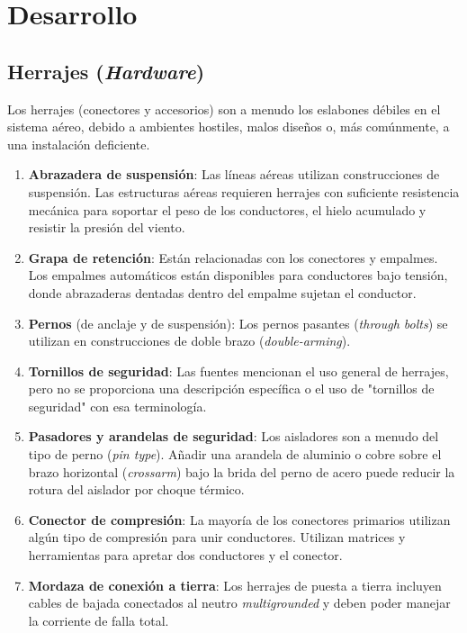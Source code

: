 \section*{Desarrollo}

\subsection*{Herrajes (\textit{Hardware})}
Los herrajes (conectores y accesorios) son a menudo los eslabones débiles en el sistema aéreo, debido a ambientes hostiles, malos diseños o, más comúnmente, a una instalación deficiente.

\begin{enumerate}
    \item \textbf{Abrazadera de suspensión}: Las líneas aéreas utilizan construcciones de suspensión. Las estructuras aéreas requieren herrajes con suficiente resistencia mecánica para soportar el peso de los conductores, el hielo acumulado y resistir la presión del viento.
    \item \textbf{Grapa de retención}: Están relacionadas con los conectores y empalmes. Los empalmes automáticos están disponibles para conductores bajo tensión, donde abrazaderas dentadas dentro del empalme sujetan el conductor.
    \item \textbf{Pernos} (de anclaje y de suspensión): Los pernos pasantes (\textit{through bolts}) se utilizan en construcciones de doble brazo (\textit{double-arming}).
    \item \textbf{Tornillos de seguridad}: Las fuentes mencionan el uso general de herrajes, pero no se proporciona una descripción específica o el uso de "tornillos de seguridad" con esa terminología.
    \item \textbf{Pasadores y arandelas de seguridad}: Los aisladores son a menudo del tipo de perno (\textit{pin type}). Añadir una arandela de aluminio o cobre sobre el brazo horizontal (\textit{crossarm}) bajo la brida del perno de acero puede reducir la rotura del aislador por choque térmico.
    \item \textbf{Conector de compresión}: La mayoría de los conectores primarios utilizan algún tipo de compresión para unir conductores. Utilizan matrices y herramientas para apretar dos conductores y el conector.
    \item \textbf{Mordaza de conexión a tierra}: Los herrajes de puesta a tierra incluyen cables de bajada conectados al neutro \textit{multigrounded} y deben poder manejar la corriente de falla total.

\end{enumerate}
